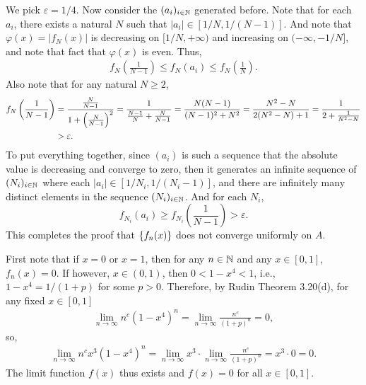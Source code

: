 \documentclass[12pt]{article}
\begin{document}
\begin{fproof}[1(b)]
    We pick \(\varepsilon = 1/4\). Now consider the \((a_i)_{i \in \mathbb {N}}\) generated before. Note that for each \(a_i\), there exists a natural \(N\) such that \(|a_i| \in [1/N, 1/(N-1)]\).
    And note that \(\varphi(x)= |f_N(x)|\) is decreasing on \([1/N, +\infty)\) and increasing on \((-\infty, -1/N]\), and note that fact that \(\varphi(x)\) is even.
    Thus,
    \begin{align*}
        f_N\left(\frac{1}{N-1}\right) \leq f_N(a_i) \leq f_N\left(\frac{1}{N}\right).
    \end{align*}
    Also note that for any natural \(N\geq 2\),
    \begin{align*}
        f_N \left( \frac{1}{N-1} \right) &= \frac{\frac{N}{N-1}}{1 + \left( \frac{N}{N-1} \right)^2} = \frac{1}{\frac{N-1}{N} + \frac{N}{N-1}} = \frac{N(N-1)}{(N-1)^2 + N^2} = \frac{N^2 - N}{2(N^2 - N) + 1} = \frac{1}{2 + \frac{1}{N^2-N}} \\
        &> \varepsilon.
    \end{align*}
    To put everything together, since \((a_i)\) is such a sequence that the absolute value is decreasing and converge to zero, then it generates an infinite sequence of \((N_i)_{i\in \mathbb {N}}\) where each \(|a_i| \in [1/N_i, 1/(N_i-1)]\), and there are infinitely many distinct elements in the sequence \((N_i)_{i \in \mathbb {N}}\).
    And for each \(N_i\), \[f_{N_i}(a_i) \geq f_{N_i}\left(\frac{1}{N-1}\right) > \varepsilon.\]
    This completes the proof that \(\left\{ f_n(x) \right\}\) does not converge uniformly on \(A\).

\end{fproof}
\newpage

\begin{fproof}[2(a)]
    First note that if \(x = 0\) or \(x = 1\), then for any \(n \in \mathbb {N}\) and any \(x \in [0,1]\), \(f_n(x) = 0\).
    If however, \(x \in (0,1)\), then \(0< 1 - x^4 < 1\), i.e., \(1-x^4 = 1/(1+p)\) for some \(p > 0\).
    Therefore, by Rudin Theorem 3.20(d), for any fixed \(x \in [0,1]\)
    \begin{align*}
        \lim_{n\to\infty} n^c(1-x^4)^n = \lim_{n\to\infty} \frac{n^c}{(1+p)^n} = 0,
    \end{align*}
    so,
    \begin{align*}
        \lim_{n\to\infty}n^cx^3(1-x^4)^n = \lim_{n\to\infty} x^3 \cdot \lim_{n\to\infty} \frac{n^c}{(1+p)^n} = x^3 \cdot 0 = 0.
    \end{align*}
    The limit function \(f(x)\) thus exists and \(f(x) = 0\) for all \(x \in [0,1].\)
\end{fproof}
\end{document}
